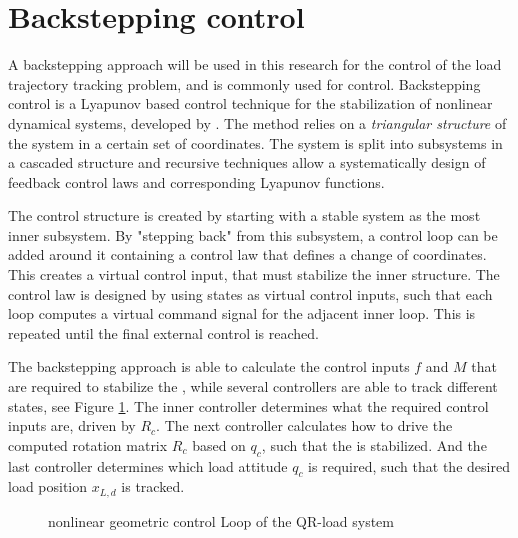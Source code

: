 \newpage
\section{Backstepping control}\label{sec:con.back}
A backstepping approach will be used in this research for the control of the load trajectory tracking problem, and is commonly used for  control\cite{Mahony2012}. Backstepping control is a Lyapunov based control technique for the stabilization of nonlinear dynamical systems, developed by \cite{Kanellakopoulos1991}. 
The method relies on a \textit{triangular structure} of the system in a certain set of coordinates. The system is split into subsystems in a cascaded structure and recursive techniques allow a systematically design of feedback control laws and corresponding Lyapunov functions.

The control structure is created by starting with a stable system as the most inner subsystem. 
By "stepping back" from this subsystem, a control loop can be added around it containing a control law that defines a change of coordinates. 
This creates a virtual control input, that must stabilize the inner structure.
The control law is designed by using states as virtual control inputs, such that each loop computes a virtual command signal for the adjacent inner loop. This is repeated until the final external control is reached.

The backstepping approach is able to calculate the control inputs $ f $ and $ M $ that are required to stabilize the , while several controllers are able to track different states, see Figure \ref{fig:con.loop}. 
The inner controller determines what the required control inputs are, driven by $ R_c $.  
The next controller calculates how to drive the computed rotation matrix $ R_c $ based on $ q_c $, such that the  is stabilized.
And the last controller determines which load attitude $ q_c $ is required, such that the desired load position $ x_{L,d} $ is tracked.
\begin{figure}[h!]
	\centering
	\caption{nonlinear geometric control Loop of the QR-load system \cite{Sreenath2013c}\label{fig:con.loop}}
\end{figure}	

